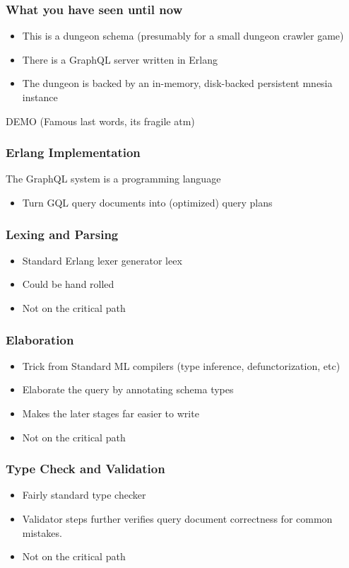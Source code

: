 \documentclass[lualatex]{beamer}
\begin{document}
\begin{frame}
  \frametitle{What you have seen until now}
  \begin{itemize}
  \item This is a dungeon schema (presumably for a small dungeon
    crawler game)
  \item There is a GraphQL server written in Erlang
  \item The dungeon is backed by an in-memory, disk-backed persistent
    mnesia instance
  \end{itemize}
\end{frame}

\begin{frame}
  DEMO (Famous last words, its fragile atm)
\end{frame}

\begin{frame}
  \frametitle{Erlang Implementation}
  The GraphQL system is a programming language
  \begin{itemize}
  \item Turn GQL query documents into (optimized) query plans
  \end{itemize}
\end{frame}

\begin{frame}
  \frametitle{Lexing and Parsing}
  \begin{itemize}
  \item Standard Erlang lexer generator leex
  \item Could be hand rolled
  \item Not on the critical path
  \end{itemize}
\end{frame}

\begin{frame}
  \frametitle{Elaboration}
  \begin{itemize}
  \item Trick from Standard ML compilers (type inference,
    defunctorization, etc)
  \item Elaborate the query by annotating schema types
  \item Makes the later stages far easier to write
  \item Not on the critical path
  \end{itemize}
\end{frame}

\begin{frame}
  \frametitle{Type Check and Validation}
  \begin{itemize}
  \item Fairly standard type checker
  \item Validator steps further verifies query document correctness
    for common mistakes.
  \item Not on the critical path
  \end{itemize}
\end{frame}
\end{document}
